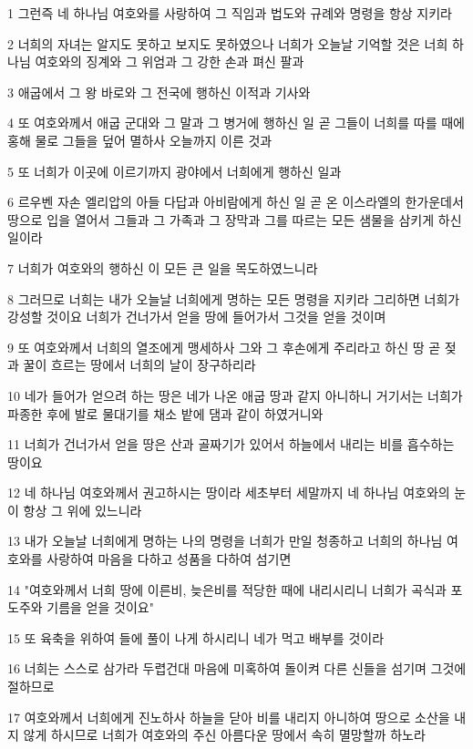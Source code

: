 \par 1 그런즉 네 하나님 여호와를 사랑하여 그 직임과 법도와 규례와 명령을 항상 지키라
\par 2 너희의 자녀는 알지도 못하고 보지도 못하였으나 너희가 오늘날 기억할 것은 너희 하나님 여호와의 징계와 그 위엄과 그 강한 손과 펴신 팔과
\par 3 애굽에서 그 왕 바로와 그 전국에 행하신 이적과 기사와
\par 4 또 여호와께서 애굽 군대와 그 말과 그 병거에 행하신 일 곧 그들이 너희를 따를 때에 홍해 물로 그들을 덮어 멸하사 오늘까지 이른 것과
\par 5 또 너희가 이곳에 이르기까지 광야에서 너희에게 행하신 일과
\par 6 르우벤 자손 엘리압의 아들 다답과 아비람에게 하신 일 곧 온 이스라엘의 한가운데서 땅으로 입을 열어서 그들과 그 가족과 그 장막과 그를 따르는 모든 샘물을 삼키게 하신 일이라
\par 7 너희가 여호와의 행하신 이 모든 큰 일을 목도하였느니라
\par 8 그러므로 너희는 내가 오늘날 너희에게 명하는 모든 명령을 지키라 그리하면 너희가 강성할 것이요 너희가 건너가서 얻을 땅에 들어가서 그것을 얻을 것이며
\par 9 또 여호와께서 너희의 열조에게 맹세하사 그와 그 후손에게 주리라고 하신 땅 곧 젖과 꿀이 흐르는 땅에서 너희의 날이 장구하리라
\par 10 네가 들어가 얻으려 하는 땅은 네가 나온 애굽 땅과 같지 아니하니 거기서는 너희가 파종한 후에 발로 물대기를 채소 밭에 댐과 같이 하였거니와
\par 11 너희가 건너가서 얻을 땅은 산과 골짜기가 있어서 하늘에서 내리는 비를 흡수하는 땅이요
\par 12 네 하나님 여호와께서 권고하시는 땅이라 세초부터 세말까지 네 하나님 여호와의 눈이 항상 그 위에 있느니라
\par 13 내가 오늘날 너희에게 명하는 나의 명령을 너희가 만일 청종하고 너희의 하나님 여호와를 사랑하여 마음을 다하고 성품을 다하여 섬기면
\par 14 "여호와께서 너희 땅에 이른비, 늦은비를 적당한 때에 내리시리니 너희가 곡식과 포도주와 기름을 얻을 것이요"
\par 15 또 육축을 위하여 들에 풀이 나게 하시리니 네가 먹고 배부를 것이라
\par 16 너희는 스스로 삼가라 두렵건대 마음에 미혹하여 돌이켜 다른 신들을 섬기며 그것에 절하므로
\par 17 여호와께서 너희에게 진노하사 하늘을 닫아 비를 내리지 아니하여 땅으로 소산을 내지 않게 하시므로 너희가 여호와의 주신 아름다운 땅에서 속히 멸망할까 하노라
